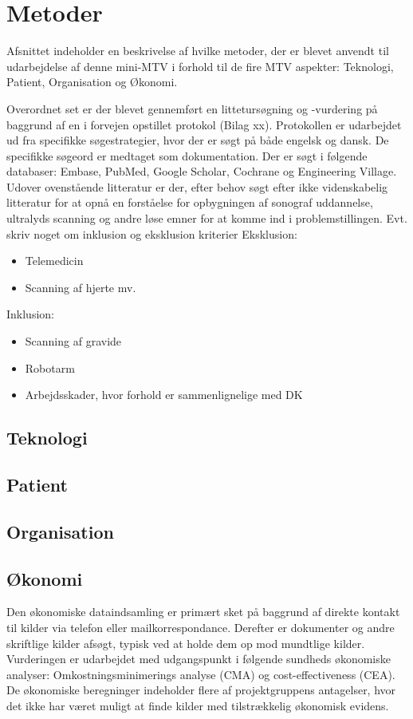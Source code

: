 \chapter{Metoder}
Afsnittet indeholder en beskrivelse af hvilke metoder, der er blevet anvendt til udarbejdelse af denne mini-MTV i forhold til de fire MTV aspekter: Teknologi, Patient, Organisation og Økonomi.

Overordnet set er der blevet gennemført en littetursøgning og -vurdering på baggrund af en i forvejen opstillet protokol (Bilag xx). Protokollen er udarbejdet ud fra specifikke søgestrategier, hvor der er søgt på både engelsk og dansk. De specifikke søgeord er medtaget som dokumentation. Der er søgt i følgende databaser: Embase, PubMed, Google Scholar, Cochrane og Engineering Village. \\
Udover ovenstående litteratur er der, efter behov søgt efter ikke videnskabelig litteratur for at opnå en forståelse for opbygningen af sonograf uddannelse, ultralyds scanning og andre løse emner for at komme ind i problemstillingen. 
Evt. skriv noget om inklusion og eksklusion kriterier
Eksklusion:
\begin{itemize}
\item Telemedicin
\item Scanning af hjerte mv.
\end{itemize}
Inklusion:
\begin{itemize}
\item Scanning af gravide
\item Robotarm
\item Arbejdsskader, hvor forhold er sammenlignelige med DK
\end{itemize}

\section{Teknologi}
\section{Patient}
\section{Organisation}
\section{Økonomi}
Den økonomiske dataindsamling er primært sket på baggrund af direkte kontakt til kilder via telefon eller mailkorrespondance. Derefter er dokumenter og andre skriftlige kilder afsøgt, typisk ved at holde dem op mod mundtlige kilder. Vurderingen er udarbejdet med udgangspunkt i følgende sundheds økonomiske analyser: Omkostningsminimerings analyse (CMA) og cost-effectiveness (CEA). De økonomiske beregninger indeholder flere af projektgruppens antagelser, hvor det ikke har været muligt at finde kilder med tilstrækkelig økonomisk evidens. 